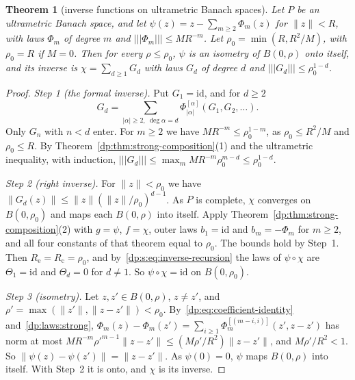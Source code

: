\documentclass[11pt]{amsart}
\newtheorem{theorem}{Theorem}[section]
\theoremstyle{definition}
\theoremstyle{remark}
\numberwithin{equation}{section}
\newcommand{\id}{\mathrm{id}}
\newcommand{\abs}[1]{\lvert #1\rvert}
\newcommand{\norm}[1]{\lVert #1\rVert}
\theoremstyle{plain}
\theoremstyle{definition}
\theoremstyle{plain}
\begin{document}
\begin{theorem}[inverse functions on ultrametric Banach spaces]\label{dp:thm:strong-inverse}
Let $P$ be an ultrametric Banach space, and let $\psi(z)=z-\sum_{m\ge2}\Phi_m(z)$ for $\norm z<R$, with laws $\Phi_m$ of degree $m$ and $\lvert\!\lvert\!\lvert \Phi_m\rvert\!\rvert\!\rvert\le MR^{-m}$. Let $\rho_0=\min(R,R^2/M)$, with $\rho_0=R$ if $M=0$. Then for every $\rho\le\rho_0$, $\psi$ is an isometry of $B(0,\rho)$ onto itself, and its inverse is $\chi=\sum_{d\ge1}G_d$ with laws $G_d$ of degree $d$ and $\lvert\!\lvert\!\lvert G_d\rvert\!\rvert\!\rvert\le\rho_0^{1-d}$.
\end{theorem}

\begin{proof}
\emph{Step 1 (the formal inverse).} Put $G_1=\id$, and for $d\ge2$
\begin{equation}\label{dp:s:eq:inverse-recursion}
 G_d=\sum_{\abs\alpha\ge2,\ \deg\alpha=d}\Phi_{\abs\alpha}^{[\alpha]}(G_1,G_2,\dots).
\end{equation}
Only $G_n$ with $n<d$ enter. For $m\ge2$ we have $MR^{-m}\le\rho_0^{1-m}$, as $\rho_0\le R^2/M$ and $\rho_0\le R$. By Theorem~\ref{dp:thm:strong-composition}(1) and the ultrametric inequality, with induction, $\lvert\!\lvert\!\lvert G_d\rvert\!\rvert\!\rvert\le\max_mMR^{-m}\rho_0^{m-d}\le\rho_0^{1-d}$.

\emph{Step 2 (right inverse).} For $\norm z<\rho_0$ we have $\norm{G_d(z)}\le\norm z(\norm z/\rho_0)^{d-1}$. As $P$ is complete, $\chi$ converges on $B(0,\rho_0)$ and maps each $B(0,\rho)$ into itself. Apply Theorem~\ref{dp:thm:strong-composition}(2) with $g=\psi$, $f=\chi$, outer laws $b_1=\id$ and $b_m=-\Phi_m$ for $m\ge2$, and all four constants of that theorem equal to $\rho_0$. The bounds hold by Step~1. Then $R_{\mathrm e}=R_{\mathrm c}=\rho_0$, and by~\eqref{dp:s:eq:inverse-recursion} the laws of $\psi\circ\chi$ are $\Theta_1=\id$ and $\Theta_d=0$ for $d\ne1$. So $\psi\circ\chi=\id$ on $B(0,\rho_0)$.

\emph{Step 3 (isometry).} Let $z,z'\in B(0,\rho)$, $z\ne z'$, and $\rho'=\max(\norm{z'},\norm{z-z'})<\rho_0$. By~\eqref{dp:eq:coefficient-identity} and~\eqref{dp:laws:strong}, $\Phi_m(z)-\Phi_m(z')=\sum_{i\ge1}\Phi_m^{[(m-i,i)]}(z',z-z')$ has norm at most $MR^{-m}\rho'^{m-1}\norm{z-z'}\le(M\rho'/R^2)\norm{z-z'}$, and $M\rho'/R^2<1$. So $\norm{\psi(z)-\psi(z')}=\norm{z-z'}$. As $\psi(0)=0$, $\psi$ maps $B(0,\rho)$ into itself. With Step~2 it is onto, and $\chi$ is its inverse.
\end{proof}
\end{document}
